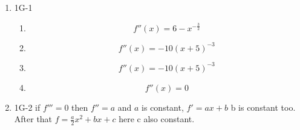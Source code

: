 \documentclass{article}
\begin{document}
\begin{enumerate}
\item 1G-1
    \begin{enumerate}
        \item 
        \begin{equation*}
            f''(x) = 6-x^{-\frac{3}{2}}
         \end{equation*}

        \item 
        \begin{equation*}
        f''(x) = -10(x+5)^{-3}
        \end{equation*}

        \item 
        \begin{equation*}
        f''(x) = -10(x+5)^{-3}
        \end{equation*}

        \item 
        \begin{equation*}
        f''(x) = 0
        \end{equation*}
    \end{enumerate}    
\item 1G-2
    if $f''' = 0$ then $f'' = a$ and $a$ is constant, $f' = ax+b$ b is constant too. After that $f = \frac{a}{2}x^2+bx+c$ here c also constant.
\end{enumerate}
\end{document}
